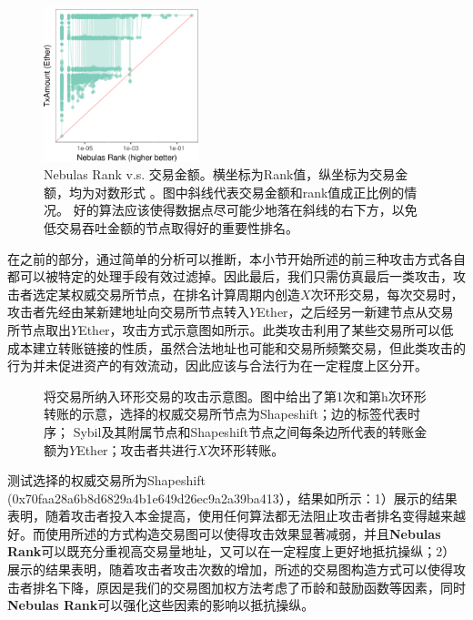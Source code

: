 \begin{figure}[!htbp]
	\centering
	\includegraphics[width=0.40\textwidth]{figs/MAY_lr.png}
  \caption{Nebulas Rank v.s.
    交易金额。\small{横坐标为Rank值，纵坐标为交易金额，均为对数形式
      。图中斜线代表交易金额和rank值成正比例的情况。
      好的算法应该使得数据点尽可能少地落在斜线的右下方，以免低交易吞吐金额的节点取得好的重要性排名。}}\label{fig:nrio}
\end{figure}


在之前的部分，通过简单的分析可以推断，本小节开始所述的前三种攻击方式各自都可以被特定的处理手段有效过滤掉。因此最后，我们只需仿真最后一类攻击，攻击者选定某权威交易所节点，在排名计算周期内创造$X$次环形交易，每次交易时，攻击者先经由某新建地址向交易所节点转入$Y$Ether，之后经另一新建节点从交易所节点取出$Y$Ether，攻击方式示意图如所示。此类攻击利用了某些交易所可以低成本建立转账链接的性质，虽然合法地址也可能和交易所频繁交易，但此类攻击的行为并未促进资产的有效流动，因此应该与合法行为在一定程度上区分开。

\begin{figure}[!ht]
	\centering
  
  \caption{将交易所纳入环形交易的攻击示意图。\small{图中给出了第1次和第h次环形转账的示意，选择的权威交易所节点为Shapeshift；边的标签代表时序； Sybil及其附属节点和Shapeshift节点之间每条边所代表的转账金额为$Y$Ether；攻击者共进行$X$次环形转账。}}\label{fig:loop}
\end{figure}

测试选择的权威交易所为Shapeshift (0x70faa28a6b8d6829a4b1e649d26ec9a2a39ba413），结果如所示：1）展示的结果表明，随着攻击者投入本金提高，使用任何算法都无法阻止攻击者排名变得越来越好。而使用所述的方式构造交易图可以使得攻击效果显著减弱，并且\textbf{Nebulas Rank}可以既充分重视高交易量地址，又可以在一定程度上更好地抵抗操纵；2）展示的结果表明，随着攻击者攻击次数的增加，所述的交易图构造方式可以使得攻击者排名下降，原因是我们的交易图加权方法考虑了币龄和鼓励函数等因素，同时\textbf{Nebulas Rank}可以强化这些因素的影响以抵抗操纵。



